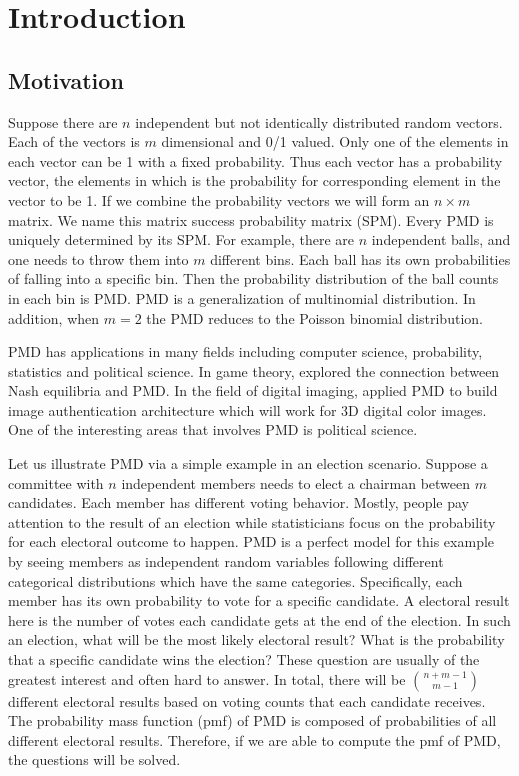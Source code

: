 \documentclass[12pt]{article}
\newcommand{\PMD}{\textrm{PMD}}
\begin{document}
\section{Introduction}
\subsection{Motivation}

Suppose there are $n$ independent but not identically distributed random vectors. Each of the vectors is $m$ dimensional and 0/1 valued. Only one of the elements in each vector can be 1 with a fixed probability. Thus each vector has a probability vector, the elements in which is the probability for corresponding element in the vector to be 1. If we combine the probability vectors we will form an $n \times m$ matrix. We name this matrix success probability matrix (SPM). Every $\PMD$ is uniquely determined by its SPM. For example, there are $n$ independent balls, and one needs to throw them into $m$ different bins. Each ball has its own probabilities of falling into a specific bin. Then the probability distribution of the ball counts in each bin is $\PMD$. $\PMD$ is a generalization of multinomial distribution. In addition, when $m=2$ the $\PMD$ reduces to the Poisson binomial distribution.

$\PMD$ has applications in many fields including computer science, probability, statistics and political science.  In game theory,  explored the connection between Nash equilibria and $\PMD$. In the field of digital imaging,  applied $\PMD$ to build image authentication architecture which will work for 3D digital color images. One of the interesting areas that involves $\PMD$ is political science. 

Let us illustrate $\PMD$ via a simple example in an election scenario. Suppose a committee with $n$  independent members needs to elect a chairman between $m$ candidates. Each member has different voting behavior. Mostly, people pay attention to the result of an election while statisticians focus on the probability for each electoral outcome to happen. $\PMD$ is a perfect model for this example by seeing members as independent random variables following different categorical distributions which have the same categories. Specifically, each member has its own probability to vote for a specific candidate. A electoral result here is the number of votes each candidate gets at the end of the election. In such an election, what will be the most likely electoral result? What is the probability that a specific candidate wins the election? These question are usually of the greatest interest and often hard to answer. In total, there will be $\binom{n+m-1}{m-1}$ different electoral results based on voting counts that each candidate receives. The probability mass function (pmf) of $\PMD$ is composed of probabilities of all different electoral results. Therefore, if we are able to compute the pmf of $\PMD$, the questions will be solved.
\end{document}
